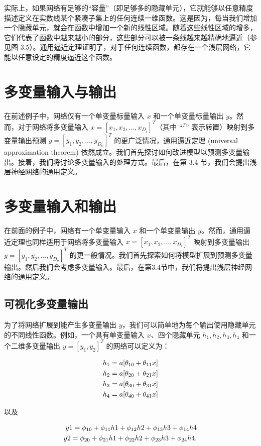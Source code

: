 \documentclass[lang=cn,newtx,10pt,scheme=chinese]{elegantbook}
\begin{document}
实际上，如果网络有足够的“容量”（即足够多的隐藏单元），它就能够以任意精度描述定义在实数线某个紧凑子集上的任何连续一维函数。这是因为，每当我们增加一个隐藏单元，就会在函数中增加一个新的线性区域。随着这些线性区域的增多，它们代表了函数中越来越小的部分，这些部分可以被一条线越来越精确地逼近（参见图 3.5）。通用逼近定理证明了，对于任何连续函数，都存在一个浅层网络，它能以任意设定的精度逼近这个函数。

\section{多变量输入与输出}
在前述例子中，网络仅有一个单变量标量输入 \(x\) 和一个单变量标量输出 \(y\)。然而，对于网络将多变量输入 \(x = [x_1, x_2, \dots, x_{D_i}]^T\)（其中 “\(^T\)” 表示转置）映射到多变量输出预测 \(y = [y_1, y_2, \dots, y_{D_o}]^T\) 的更广泛情况，通用逼近定理 (universal approximation theorem) 依然成立。我们首先探讨如何改进模型以预测多变量输出。接着，我们将讨论多变量输入的处理方式。最后，在第 3.4 节，我们会提出浅层神经网络的通用定义。
\section{多变量输入和输出}
在前面的例子中，网络有一个单变量输入 \(x\) 和一个单变量输出 \(y\)。然而，通用逼近定理也同样适用于网络将多变量输入 \(x = [x_1, x_2, \dots, x_{D_i}]^T\) 映射到多变量输出 \(y = [y_1, y_2, \dots, y_{D_o}]^T\) 的更一般情况。我们首先探索如何将模型扩展到预测多变量输出。然后我们会考虑多变量输入。最后，在第3.4节中，我们将提出浅层神经网络的通用定义。
\subsection{可视化多变量输出}
为了将网络扩展到能产生多变量输出 \(y\)，我们可以简单地为每个输出使用隐藏单元的不同线性函数。例如，一个具有单变量输入 \(x\)、四个隐藏单元 \(h_1, h_2, h_3, h_4\) 和一个二维多变量输出 \(y = [y_1, y_2]^T\) 的网络可以定义为：


\begin{align}
	h_1 = a[\theta_{10} + \theta_{11}x] \notag \\
	h_2 = a[\theta_{20} + \theta_{21}x] \notag \\
	h_3 = a[\theta_{30} + \theta_{31}x] \notag \\
	h_4 = a[\theta_{40} + \theta_{41}x]  
\end{align} 

以及

\begin{align}
	y1 = \phi_{10} + \phi_{11}h1 + \phi_{12}h2 + \phi_{13}h3 + \phi_{14}h4 \notag \\
	y2 = \phi_{20} + \phi_{21}h1 + \phi_{22}h2 + \phi_{23}h3 + \phi_{24}h4. 
\end{align} 
\end{document}
